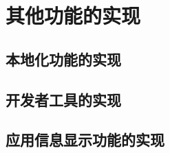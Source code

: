 

\section{其他功能的实现}\label{sec:other}

\subsection{本地化功能的实现}\label{subsec:l10n}


\subsection{开发者工具的实现}\label{subsec:dev-tools}


\subsection{应用信息显示功能的实现}\label{subsec:about}

